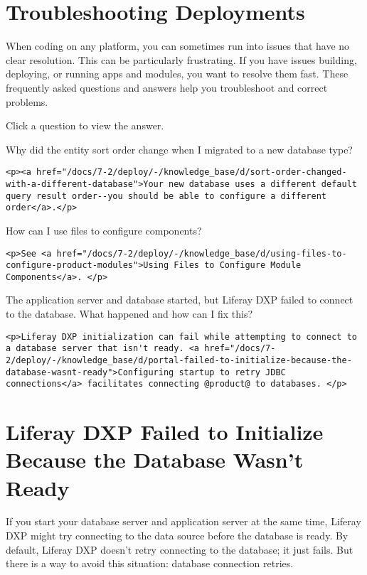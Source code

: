 \chapter{Troubleshooting Deployments}\label{troubleshooting-deployments}

When coding on any platform, you can sometimes run into issues that have
no clear resolution. This can be particularly frustrating. If you have
issues building, deploying, or running apps and modules, you want to
resolve them fast. These frequently asked questions and answers help you
troubleshoot and correct problems.

Click a question to view the answer.

{Why did the entity sort order change when I migrated to a new database
type?~{}}

\begin{verbatim}
<p><a href="/docs/7-2/deploy/-/knowledge_base/d/sort-order-changed-with-a-different-database">Your new database uses a different default query result order--you should be able to configure a different order</a>.</p>
\end{verbatim}

{How can I use files to configure components?~{}}

\begin{verbatim}
<p>See <a href="/docs/7-2/deploy/-/knowledge_base/d/using-files-to-configure-product-modules">Using Files to Configure Module Components</a>. </p>
\end{verbatim}

{The application server and database started, but Liferay DXP failed to
connect to the database. What happened and how can I fix this?~{}}

\begin{verbatim}
<p>Liferay DXP initialization can fail while attempting to connect to a database server that isn't ready. <a href="/docs/7-2/deploy/-/knowledge_base/d/portal-failed-to-initialize-because-the-database-wasnt-ready">Configuring startup to retry JDBC connections</a> facilitates connecting @product@ to databases. </p>
\end{verbatim}

\chapter{Liferay DXP Failed to Initialize Because the Database Wasn't
Ready}\label{liferay-dxp-failed-to-initialize-because-the-database-wasnt-ready}

If you start your database server and application server at the same
time, Liferay DXP might try connecting to the data source before the
database is ready. By default, Liferay DXP doesn't retry connecting to
the database; it just fails. But there is a way to avoid this situation:
database connection retries.

